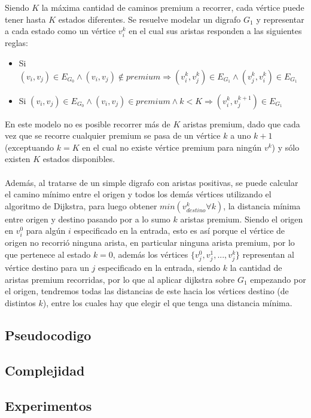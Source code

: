 Siendo $K$ la máxima cantidad de caminos premium a recorrer, cada vértice puede tener hasta $K$ estados diferentes. Se resuelve modelar un digrafo $G_1$ y representar a cada estado como un vértice $v_i^k$ en el cual sus aristas responden a las siguientes reglas:
\begin{itemize}
	\item Si $(v_i,v_j) \in E_{G_0} \land (v_i,v_j) \notin premium \Rightarrow (v_i^k,v_j^k) \in E_{G_1} \land (v_j^k,v_i^k) \in E_{G_1}$
	\item Si $(v_i,v_j) \in E_{G_0} \land (v_i,v_j) \in premium \land k < K \Rightarrow (v_i^k,v_j^{k+1}) \in E_{G_1}$
\end{itemize}
En este modelo no es posible recorrer más de $K$ aristas premium, dado que cada vez que se recorre cualquier premium se pasa de un vértice $k$ a uno $k+1$ (exceptuando $k=K$ en el cual no existe vértice premium para ningún $v^k$) y sólo existen $K$ estados disponibles.\\\\
Además, al tratarse de un simple digrafo con aristas positivas, se puede calcular el camino mínimo entre el origen y todos los demás vértices utilizando el algoritmo de Dijkstra, para luego obtener $min(v_{destino}^k \forall k)$, la distancia mínima entre origen y destino pasando por a lo sumo $k$ aristas premium. Siendo el origen en $v_i^0$ para algún $i$ especificado en la entrada, esto es así porque el vértice de origen no recorrió ninguna arista, en particular ninguna arista premium, por lo que pertenece al estado $k=0$, además los vértices $\{v_j^0,v_j^1,...,v_j^k\}$ representan al vértice destino para un $j$ especificado en la entrada, siendo $k$ la cantidad de aristas premium recorridas, por lo que al aplicar dijkstra sobre $G_1$ empezando por el origen, tendremos todas las distancias de este hacia los vértices destino (de distintos $k$), entre los cuales hay que elegir el que tenga una distancia mínima. \\
\subsection{Pseudocodigo}
\subsection{Complejidad}
\subsection{Experimentos}
